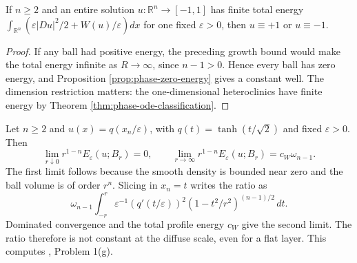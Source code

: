 \begin{corollary}\label{cor:phase-finite-total-energy}
If $n\geq2$ and an entire solution $u:\mathbb R^n\to[-1,1]$ has finite total energy $\int_{\mathbb R^n}(\varepsilon|Du|^2/2+W(u)/\varepsilon)dx$ for one fixed $\varepsilon>0$, then $u\equiv+1$ or $u\equiv-1$.
\end{corollary}
\begin{proof}
If any ball had positive energy, the preceding growth bound would make the total energy infinite as $R\to\infty$, since $n-1>0$. Hence every ball has zero energy, and Proposition \ref{prop:phase-zero-energy} gives a constant well. The dimension restriction matters: the one-dimensional heteroclinics have finite energy by Theorem \ref{thm:phase-ode-classification}.
\end{proof}

\begin{example}\label{ex:phase-flat-density-ratio}
Let $n\geq2$ and $u(x)=q(x_n/\varepsilon)$, with $q(t)=\tanh(t/\sqrt2)$ and fixed $\varepsilon>0$. Then
\[
 \lim_{r\downarrow0}r^{1-n}E_\varepsilon(u;B_r)=0,
 \qquad
 \lim_{r\to\infty}r^{1-n}E_\varepsilon(u;B_r)=c_W\omega_{n-1}.
\]
The first limit follows because the smooth density is bounded near zero and the ball volume is of order $r^n$. Slicing in $x_n=t$ writes the ratio as
\[
 \omega_{n-1}\int_{-r}^{r}\varepsilon^{-1}(q'(t/\varepsilon))^2
 (1-t^2/r^2)^{(n-1)/2}\,dt.
\]
Dominated convergence and the total profile energy $c_W$ give the second limit. The ratio therefore is not constant at the diffuse scale, even for a flat layer. This computes \cite{ChAC}, Problem 1(g).
\end{example}
